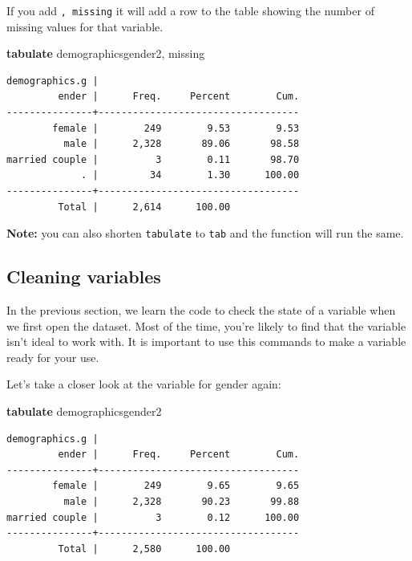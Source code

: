 \documentclass[
]{book}
\newenvironment{Shaded}{\begin{snugshade}}{\end{snugshade}}
\newcommand{\FunctionTok}[1]{\textcolor[rgb]{0.00,0.00,0.00}{#1}}
\newcommand{\KeywordTok}[1]{\textcolor[rgb]{0.13,0.29,0.53}{\textbf{#1}}}
\newcommand{\NormalTok}[1]{#1}
\begin{document}
If you add \texttt{,\ missing} it will add a row to the table showing the number of missing values for that variable.

\begin{Shaded}
\begin{Highlighting}[]
\KeywordTok{tabulate}\NormalTok{ demographicsgender2, }\FunctionTok{missing}
\end{Highlighting}
\end{Shaded}

\begin{verbatim}
demographics.g |
         ender |      Freq.     Percent        Cum.
---------------+-----------------------------------
        female |        249        9.53        9.53
          male |      2,328       89.06       98.58
married couple |          3        0.11       98.70
             . |         34        1.30      100.00
---------------+-----------------------------------
         Total |      2,614      100.00
\end{verbatim}

\textbf{Note:} you can also shorten \texttt{tabulate} to \texttt{tab} and the function will run the same.

\hypertarget{cleaning-variables}{%
\subsection*{Cleaning variables}\label{cleaning-variables}}

In the previous section, we learn the code to check the state of a variable when we first open the dataset. Most of the time, you're likely to find that the variable isn't ideal to work with. It is important to use this commands to make a variable ready for your use.

Let's take a closer look at the variable for gender again:

\begin{Shaded}
\begin{Highlighting}[]
\KeywordTok{tabulate}\NormalTok{ demographicsgender2}
\end{Highlighting}
\end{Shaded}

\begin{verbatim}
demographics.g |
         ender |      Freq.     Percent        Cum.
---------------+-----------------------------------
        female |        249        9.65        9.65
          male |      2,328       90.23       99.88
married couple |          3        0.12      100.00
---------------+-----------------------------------
         Total |      2,580      100.00
\end{verbatim}
\end{document}
